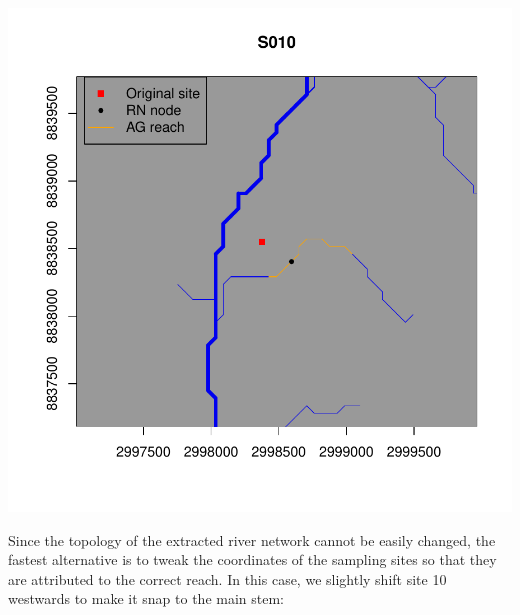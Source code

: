 \documentclass[
]{article}
\newenvironment{Shaded}{\begin{snugshade}}{\end{snugshade}}
\newcommand{\AttributeTok}[1]{\textcolor[rgb]{0.13,0.29,0.53}{#1}}
\newcommand{\DecValTok}[1]{\textcolor[rgb]{0.00,0.00,0.81}{#1}}
\newcommand{\FunctionTok}[1]{\textcolor[rgb]{0.13,0.29,0.53}{\textbf{#1}}}
\newcommand{\NormalTok}[1]{#1}
\newcommand{\OtherTok}[1]{\textcolor[rgb]{0.56,0.35,0.01}{#1}}
\newcommand{\SpecialCharTok}[1]{\textcolor[rgb]{0.81,0.36,0.00}{\textbf{#1}}}
\begin{document}
\includegraphics{Illustrating_eDITH_files/figure-latex/unnamed-chunk-12-1.pdf}

Since the topology of the extracted river network cannot be easily changed, the fastest alternative is to tweak the coordinates of the sampling sites so that they are attributed to the correct reach. In this case, we slightly shift site 10 westwards to make it snap to the main stem:

\begin{Shaded}
\end{Shaded}
\end{document}
